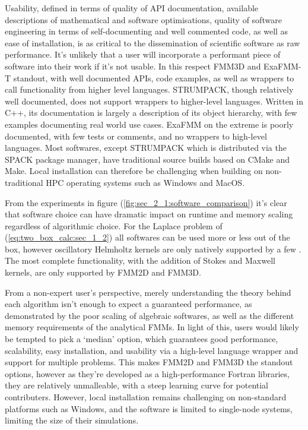 Usability, defined in terms of quality of API documentation, available descriptions of mathematical and software optimisations,  quality of software engineering in terms of self-documenting and well commented code, as well as ease of installation, is as critical to the dissemination of scientific software as raw performance. It's unlikely that a user will incorporate a performant piece of software into their work if it's not usable. In this respect FMM3D and ExaFMM-T standout, with well documented APIs, code examples, as well as wrappers to call functionality from higher level languages. STRUMPACK, though relatively well documented, does not support wrappers to higher-level languages. Written in C++, its documentation is largely a description of its object hierarchy, with few examples documenting real world use cases. ExaFMM on the extreme is poorly documented, with few tests or comments, and no wrappers to high-level languages. Most softwares, except STRUMPACK which is distributed via the SPACK package manager, have traditional source builds based on CMake and Make. Local installation can therefore be challenging when building on non-traditional HPC operating systems such as Windows and MacOS.

From the experiments in figure (\ref{fig:sec_2_1:software_comparison}) it's clear that software choice can have dramatic impact on runtime and memory scaling regardless of algorithmic choice. For the Laplace problem of (\ref{eq:two_box_calc:sec_1_2}) all softwares can be used more or less out of the box, however oscillatory Helmholtz kernels are only natively supported by a few \cite{exafmm,wang2021exafmm,fmm2d, fmm3d}. The most complete functionality, with the addition of Stokes and Maxwell kernels, are only supported by FMM2D and FMM3D. 

From a non-expert user's perspective, merely understanding the theory behind each algorithm isn't enough to expect a guaranteed performance, as demonstrated by the poor scaling of algebraic softwares, as well as the different memory requirements of the analytical FMMs. In light of this, users would likely be tempted to pick a `median' option, which guarantees good performance, scalability, easy installation, and usability via a high-level language wrapper and support for multiple problems. This makes FMM2D and FMM3D the standout options, however as they're developed as a high-performance Fortran libraries, they are relatively unmalleable, with a steep learning curve for potential contributers. However, local installation remains challenging on non-standard platforms such as Windows, and the software is limited to single-node systems, limiting the size of their simulations.

